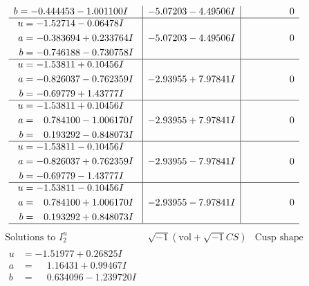 \documentclass[1p]{elsarticle_modified}
\theoremstyle{definition}
\newcommand{\I}{\sqrt{-1}}
\begin{document}
$$\begin{array}{c|c|c}
\begin{aligned}
b &= -0.444453 - 1.001100 I\end{aligned}
 & -5.07203 - 4.49506 I & \phantom{-0.000000 } 0 \\ \hline\begin{aligned}
u &= -1.52714 - 0.06478 I \\
a &= -0.383694 + 0.233764 I \\
b &= -0.746188 - 0.730758 I\end{aligned}
 & -5.07203 - 4.49506 I & \phantom{-0.000000 } 0 \\ \hline\begin{aligned}
u &= -1.53811 + 0.10456 I \\
a &= -0.826037 - 0.762359 I \\
b &= -0.69779 + 1.43777 I\end{aligned}
 & -2.93955 + 7.97841 I & \phantom{-0.000000 } 0 \\ \hline\begin{aligned}
u &= -1.53811 + 0.10456 I \\
a &= \phantom{-}0.784100 - 1.006170 I \\
b &= \phantom{-}0.193292 - 0.848073 I\end{aligned}
 & -2.93955 + 7.97841 I & \phantom{-0.000000 } 0 \\ \hline\begin{aligned}
u &= -1.53811 - 0.10456 I \\
a &= -0.826037 + 0.762359 I \\
b &= -0.69779 - 1.43777 I\end{aligned}
 & -2.93955 - 7.97841 I & \phantom{-0.000000 } 0 \\ \hline\begin{aligned}
u &= -1.53811 - 0.10456 I \\
a &= \phantom{-}0.784100 + 1.006170 I \\
b &= \phantom{-}0.193292 + 0.848073 I\end{aligned}
 & -2.93955 - 7.97841 I & \phantom{-0.000000 } 0\\
 \hline 
 \end{array}$$\newpage$$\begin{array}{c|c|c}  
\text{Solutions to }I^u_{2}& \I (\text{vol} + \sqrt{-1}CS) & \text{Cusp shape}\\
 \hline 
\begin{aligned}
u &= -1.51977 + 0.26825 I \\
a &= \phantom{-}1.16431 + 0.99467 I \\
b &= \phantom{-}0.634096 - 1.239720 I\end{aligned}

\end{array}$$
\end{document}

